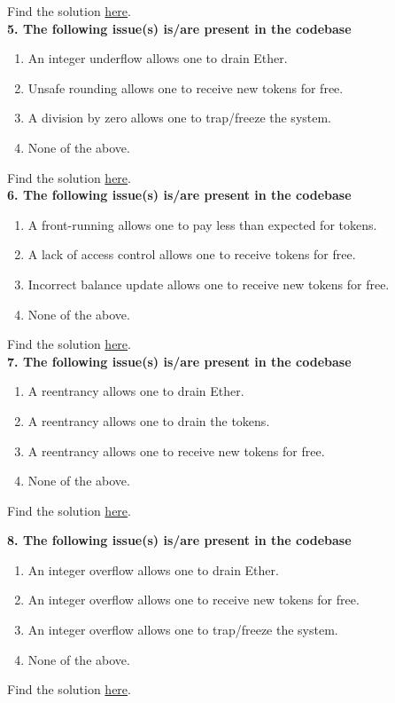 Find the solution \hyperref[sec:exam5_q4]{here}.\\

\textbf{5. The following issue(s) is/are present in the codebase}

\begin{enumerate}[label=\Alph*.]
    \item An integer underflow allows one to drain Ether.
    \item Unsafe rounding allows one to receive new tokens for free.
    \item A division by zero allows one to trap/freeze the system.
    \item None of the above.
\end{enumerate}

Find the solution \hyperref[sec:exam5_q5]{here}.\\

\textbf{6. The following issue(s) is/are present in the codebase}

\begin{enumerate}[label=\Alph*.]
    \item A front-running allows one to pay less than expected for tokens.
    \item A lack of access control allows one to receive tokens for free.
    \item Incorrect balance update allows one to receive new tokens for free.
    \item None of the above.
\end{enumerate}

Find the solution \hyperref[sec:exam5_q6]{here}.\\

\textbf{7. The following issue(s) is/are present in the codebase}

\begin{enumerate}[label=\Alph*.]
    \item A reentrancy allows one to drain Ether.
    \item A reentrancy allows one to drain the tokens.
    \item A reentrancy allows one to receive new tokens for free.
    \item None of the above.
\end{enumerate}

Find the solution \hyperref[sec:exam5_q7]{here}.\\

\pagebreak

\textbf{8. The following issue(s) is/are present in the codebase}

\begin{enumerate}[label=\Alph*.]
    \item An integer overflow allows one to drain Ether.
    \item An integer overflow allows one to receive new tokens for free.
    \item An integer overflow allows one to trap/freeze the system.
    \item None of the above.
\end{enumerate}

Find the solution \hyperref[sec:exam5_q8]{here}.\\